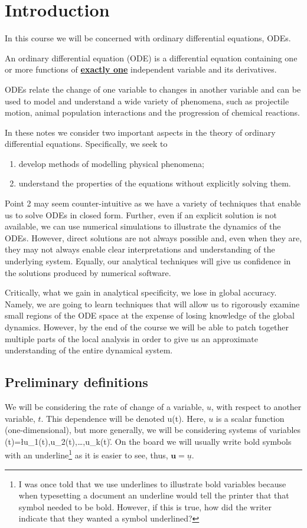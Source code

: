 \chapter{Introduction}
In this course we will be concerned with ordinary differential equations, ODEs.

\begin{defin}
An ordinary differential equation (ODE) is a differential equation containing one or more functions of \underline{\textbf{exactly one}} independent variable and its derivatives.
\end{defin}

ODEs relate the change of one variable to changes in another variable and can be used to model and understand a wide variety of phenomena, such as projectile motion, animal population interactions and the progression of chemical reactions.

In these notes we consider two important aspects in the theory of ordinary differential equations. Specifically, we seek to
\begin{enumerate}
\item develop methods of modelling physical phenomena;
\item understand the properties of the equations without explicitly solving them.
\end{enumerate}

Point 2 may seem counter-intuitive as we have a variety of techniques that enable us to solve ODEs in closed form. Further, even if an explicit solution is not available, we can use numerical simulations to illustrate the dynamics of the ODEs. However, direct solutions are not always possible and, even when they are, they may not always enable clear interpretations and understanding of the underlying system. Equally, our analytical techniques will give us confidence in the solutions produced by numerical software.

Critically, what we gain in analytical specificity, we lose in global accuracy. Namely, we are going to learn techniques that will allow us to rigorously examine small regions of the ODE space at the expense of losing knowledge of the global dynamics. However, by the end of the course we will be able to patch together multiple parts of the local analysis in order to give us an approximate understanding of the entire dynamical system.

\section{Preliminary definitions}
We will be considering the rate of change of a variable, $u$, with respect to another variable, $t$. This dependence will be denoted
\bb
u(t).
\ee
Here, $u$ is a scalar function (\ie one-dimensional), but more generally, we will be considering systems of variables
\bb
{}(t)=\l u_1(t),u_2(t),\dots,u_k(t)\r.
\ee
On the board we will usually write bold symbols with an underline\footnote{I was once told that we use underlines to illustrate bold variables because when typesetting a document an underline would tell the printer that that symbol needed to be bold. However, if this is true, how did the writer indicate that they wanted a symbol underlined?} as it is easier to see, thus, $\bm{u}=\underline{u}$.

